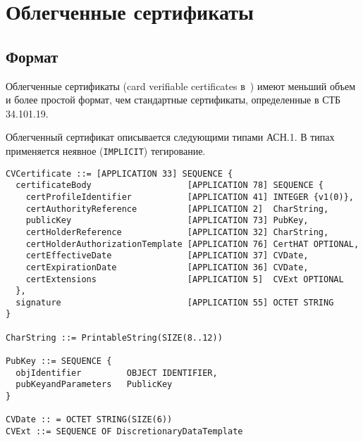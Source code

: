 \chapter{Облегченные сертификаты}\label{CERTS}

\section{Формат}\label{CERTS.Format}

Облегченные сертификаты (card verifiable certificates в~\cite{LightCerts}) 
имеют меньший объем и более простой формат, чем стандартные сертификаты,
определенные в СТБ 34.101.19.

Облегченный сертификат описывается следующими типами АСН.1.
В типах применяется неявное (\verb|IMPLICIT|) тегирование. 

\begin{verbatim}
CVCertificate ::= [APPLICATION 33] SEQUENCE {
  certificateBody                   [APPLICATION 78] SEQUENCE {
    certProfileIdentifier           [APPLICATION 41] INTEGER {v1(0)},
    certAuthorityReference          [APPLICATION 2]  CharString,
    publicKey                       [APPLICATION 73] PubKey,
    certHolderReference             [APPLICATION 32] CharString,
    certHolderAuthorizationTemplate [APPLICATION 76] CertHAT OPTIONAL,
    certEffectiveDate               [APPLICATION 37] CVDate,
    certExpirationDate              [APPLICATION 36] CVDate,
    certExtensions                  [APPLICATION 5]  CVExt OPTIONAL 
  },
  signature                         [APPLICATION 55] OCTET STRING
}

CharString ::= PrintableString(SIZE(8..12))

PubKey ::= SEQUENCE {
  objIdentifier         OBJECT IDENTIFIER,
  pubKeyandParameters   PublicKey
}

CVDate :: = OCTET STRING(SIZE(6))
CVExt ::= SEQUENCE OF DiscretionaryDataTemplate
\end{verbatim}

